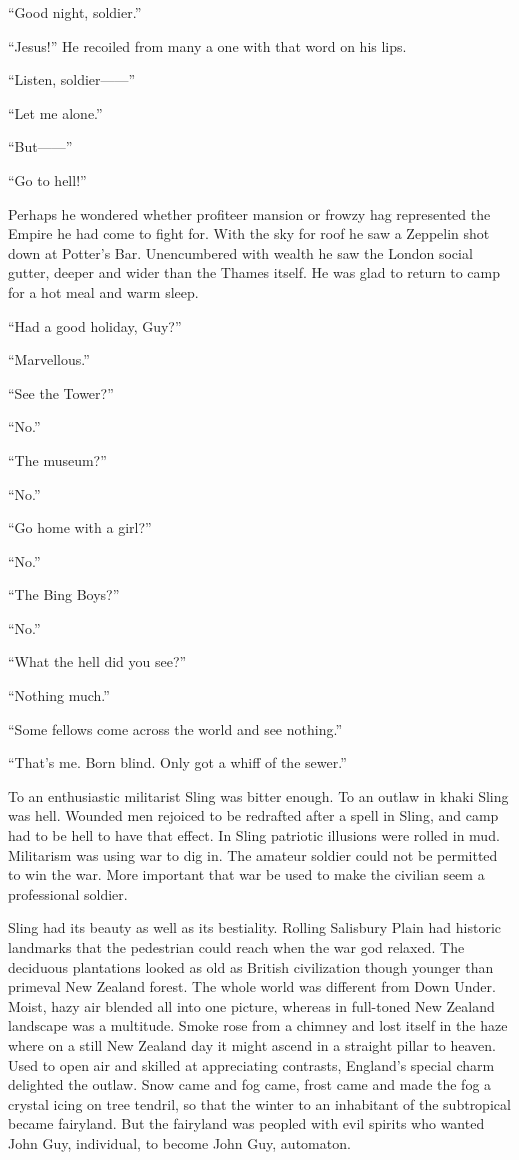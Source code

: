 ``Good night, soldier.''

``Jesus!'' He recoiled from many a one with that word on his lips.

``Listen, soldier------''

``Let me alone.''

``But------''

``Go to hell!''

Perhaps he wondered whether profiteer mansion or frowzy hag represented 
the Empire he had come to fight for. With the sky for roof he saw a Zeppelin 
shot down at Potter's Bar. Unencumbered with wealth he saw the London social 
gutter, deeper and wider than the Thames itself. He was glad to return to 
camp for a hot meal and warm sleep.

``Had a good holiday, Guy?''

``Marvellous.''

``See the Tower?''

``No.''

``The museum?''

``No.''

``Go home with a girl?''

``No.''

``The Bing Boys?''

``No.''

``What the hell did you see?''

``Nothing much.''

``Some fellows come across the world and see nothing.''

``That's me. Born blind. Only got a whiff of the sewer.''

To an enthusiastic militarist Sling was bitter enough. To an outlaw in 
khaki Sling was hell. Wounded men rejoiced to be redrafted after a spell 
in Sling, and camp had to be hell to have that effect. In Sling patriotic 
illusions were rolled in mud. Militarism was using war to dig in. The 
amateur soldier could not be permitted to win the war. More 
important that war be used to make the civilian seem a professional 
soldier.

Sling had its beauty as well as its bestiality. Rolling Salisbury Plain 
had historic landmarks that the pedestrian could reach when the war god 
relaxed. The deciduous plantations looked as old as British civilization 
though younger than primeval New Zealand forest. The whole world was different 
from Down Under. Moist, hazy air blended all into one picture, whereas in 
full-toned New Zealand landscape was a multitude. Smoke rose from a 
chimney and lost itself in the haze where on a still New Zealand day it 
might ascend in a straight pillar to heaven. Used to open air and skilled 
at appreciating contrasts, England's special charm delighted the outlaw. 
Snow came and fog came, frost came and made the fog a crystal icing on 
tree tendril, so that the winter to an inhabitant of the subtropical 
became fairyland. But the fairyland was peopled with evil spirits who 
wanted John Guy, individual, to become John Guy, automaton.

